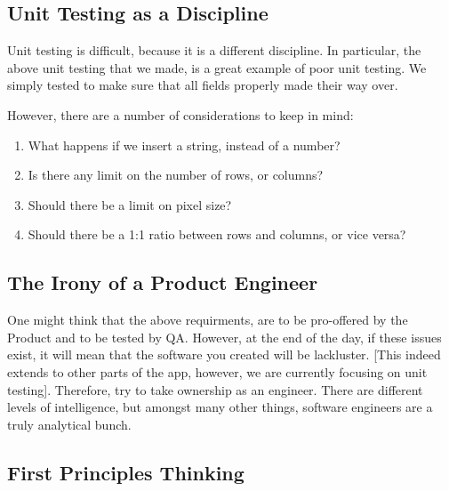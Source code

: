 \subsection{ Unit Testing as a Discipline }

Unit testing is difficult, because it is a different discipline. In particular,
the above unit testing that we made, is a great example of poor unit testing.
We simply tested to make sure that all fields properly made their way over.

However, there are a number of considerations to keep in mind:
\begin{enumerate}
  \item What happens if we insert a string, instead of a number?
  \item Is there any limit on the number of rows, or columns?
  \item Should there be a limit on pixel size?
  \item Should there be a 1:1 ratio between rows and columns, or vice versa?
\end{enumerate}

\subsection{ The Irony of a Product Engineer }
One might think that the above requirments, are to be pro-offered by the Product
and to be tested by QA. However, at the end of the day, if these issues exist,
it will mean that the software you created will be lackluster. [This indeed
extends to other parts of the app, however, we are currently focusing on
unit testing]. Therefore, try to take ownership as an engineer. There are
different levels of intelligence, but amongst many other things, software
engineers are a truly analytical bunch.

\subsection{ First Principles Thinking }

